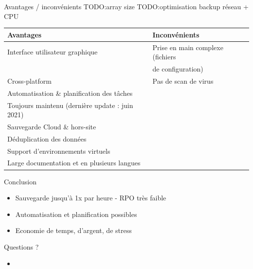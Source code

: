 \documentclass[aspectratio=169]{beamer}
\newcommand{\TODO}{TODO:}
\begin{document}
\begin{frame}{Avantages / inconvénients}
\TODO array size
 \TODO optimisation backup réseau + CPU
    \begin{center}
     \begin{tabular}{|l|l|}
     \hline
      \textbf{Avantages} & \textbf{Inconvénients} \\
     \hline
     \hline
        Interface utilisateur graphique & Prise en main complexe (fichiers \\ 
        & de configuration) \\
     \hline
      Cross-platform & Pas de scan de virus \\
     \hline
      Automatisation \& planification des tâches & \\
     \hline
     Toujours maintenu (dernière update : juin 2021) & \\
     \hline
     Sauvegarde Cloud \& hors-site & \\
     \hline
     Déduplication des données & \\
     \hline
     Support d'environnements virtuels & \\
     \hline
     Large documentation et en plusieurs langues & \\
     \hline
     \end{tabular}

    \end{center}

\end{frame}

\begin{frame}{Conclusion}
 \begin{itemize}
  \item Sauvegarde jusqu'à 1x par heure - RPO très faible
  \item Automatisation et planification possibles
  \item Economie de temps, d'argent, de stress
 \end{itemize}
\end{frame}

\begin{frame}{Questions ?}
 \begin{itemize}
   \item
 \end{itemize}
\end{frame}
\end{document}
